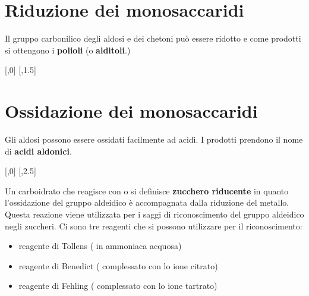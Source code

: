 \section{Riduzione dei monosaccaridi}
Il gruppo carbonilico degli aldosi e dei chetoni può essere ridotto e come prodotti si ottengono i \textbf{polioli} (o \textbf{alditoli}.)
\begin{reaction}
	[,0]
	\arrow
	\arrow{->[1. \ch{NaBH4}][2. \ch{H2O}]}[,1.5]
\end{reaction}


\section{Ossidazione dei monosaccaridi}
Gli aldosi possono essere ossidati facilmente ad acidi. I prodotti prendono il nome di \textbf{acidi aldonici}.

\begin{reaction}
	[,0]
	\arrow{->[\ch{Br2}, \ch{H2O}][oppure \ch[circled=formal]{Ag+} o \ch[circled=formal]{Cu^{2+}}]}[,2.5]
\end{reaction}

Un carboidrato che reagisce con  o  si definisce \textbf{zucchero riducente} in quanto l'ossidazione del gruppo aldeidico è accompagnata dalla riduzione del metallo. Questa reazione viene utilizzata per i saggi di riconoscimento del gruppo aldeidico negli zuccheri. Ci sono tre reagenti che si possono utilizzare per il riconoscimento:
\begin{itemize}
	\item reagente di Tollens ( in ammoniaca acquosa)
	\item reagente di Benedict ( complessato con lo ione citrato)
	\item reagente di Fehling ( complessato con lo ione tartrato)
\end{itemize}

